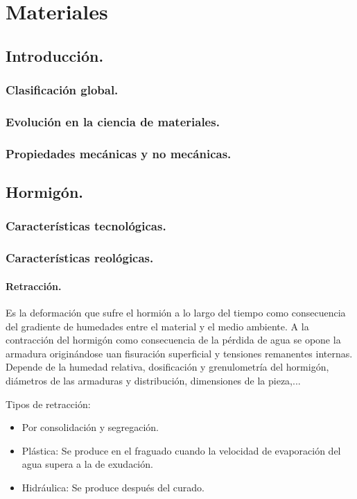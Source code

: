 \chapter{Materiales}
\section{Introducción.}
\subsection{Clasificación global.}
\subsection{Evolución en la ciencia de materiales.}
\subsection{Propiedades mecánicas y no mecánicas.}

\section{Hormigón.}
\subsection{Características tecnológicas.}
\subsection{Características reológicas.}

\subsubsection{Retracción.}
Es la deformación que sufre el hormión a lo largo del tiempo como consecuencia del gradiente de humedades entre el material y el medio ambiente. A la contracción del hormigón como consecuencia de la pérdida de agua se opone la armadura originándose uan fisuración superficial y tensiones remanentes internas. Depende de la humedad relativa, dosificación y grenulometría del hormigón, diámetros de las armaduras y distribución, dimensiones de la pieza,... 

Tipos de retracción:
\begin{itemize}
    \item Por consolidación y segregación.
    \item Plástica: Se produce en el fraguado cuando la velocidad de evaporación del agua supera a la de exudación.
    \item Hidráulica: Se produce después del curado.
\end{itemize}

